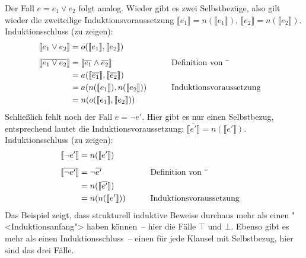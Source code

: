 Der Fall $e=e_1\vee e_2$ folgt analog.  Wieder gibt es zwei
Selbstbezüge, also gilt wieder die zweiteilige Induktionsvoraussetzung
$\llbracket \overline{e_1} \rrbracket = n(\llbracket e_1\rrbracket)$,
$\llbracket \overline{e_2} \rrbracket = n(\llbracket e_2\rrbracket)$.
Induktionsschluss (zu zeigen):
%
\begin{alignat*}{3}
  \llbracket e_1 \vee e_2 \rrbracket &= o(\llbracket
  e_1\rrbracket, \llbracket e_2\rrbracket)
  \\[1ex]
  \llbracket \overline{e_1 \vee e_2} \rrbracket &= \llbracket
  \overline{e_1} \wedge \overline{e_2} \rrbracket
  && \qquad \text{Definition von $\overline{\raisebox{1ex}{\hspace{1ex}}}$}
  \\
  &= 
  a(\llbracket \overline{e_1} \rrbracket,  \llbracket \overline{e_2}
  \rrbracket)
  \\
  &= a(n(\llbracket e_1\rrbracket), n(\llbracket e_2\rrbracket))
  && \qquad \text{Induktionsvoraussetzung}
  \\
  &= n(o(\llbracket e_1\rrbracket, \llbracket e_2\rrbracket))
\end{alignat*}
%
Schließlich fehlt noch der Fall $e = \neg e'$.  Hier gibt es nur
einen Selbstbezug, entsprechend lautet die Induktionsvoraussetzung:
$\llbracket \overline{e'} \rrbracket = n(\llbracket e'\rrbracket)$.
Induktionsschluss (zu zeigen):
%
\begin{alignat*}{3}
  \llbracket \neg e' \rrbracket &= n(\llbracket e'\rrbracket)
  \\[1ex]
  \llbracket \overline{\neg e'} \rrbracket
  & =
  \neg \overline{e'}
  && \qquad \text{Definition von $\overline{\raisebox{1ex}{\hspace{1ex}}}$}
  \\
  &=
  n(\llbracket \overline{e'}\rrbracket)
  \\
  &= n(n(\llbracket e' \rrbracket))
  && \qquad \text{Induktionsvoraussetzung}
\end{alignat*}
%
Das Beispiel zeigt, dass strukturell induktive Beweise durchaus mehr
als einen "<Induktionsanfang"> haben können~-- hier die Fälle $\top$
und $\bot$.  Ebenso gibt es mehr als einen Induktionsschluss~-- einen
für jede Klausel mit Selbstbezug, hier sind das drei Fälle.

